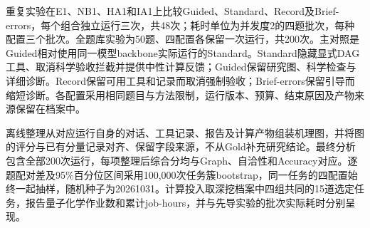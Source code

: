 重复实验在E1、NB1、HA1和IA1上比较Guided、Standard、Record及Brief-errors，每个组合独立运行三次，共48次；耗时单位为并发度2的四题批次，每种配置三个批次。全题库实验为50题、四配置各保留一次运行，共200次。主对照是Guided相对使用同一模型backbone实际运行的Standard。Standard隐藏显式DAG工具、取消科学验收拦截并提供中性计算反馈；Guided保留研究图、科学检查与详细诊断。Record保留可用工具和记录而取消强制验收；Brief-errors保留引导而缩短诊断。各配置采用相同题目与方法限制，运行版本、预算、结束原因及产物来源保留在档案中。

离线整理从对应运行自身的对话、工具记录、报告及计算产物组装机理图，并将图的评分与已有分量记录对齐、保留字段来源，不从Gold补充研究结论。最终分析包含全部200次运行，每项整理后综合分均与Graph、自洽性和Accuracy对应。逐题配对差及95\%百分位区间采用100,000次任务簇bootstrap，同一任务的四配置始终一起抽样，随机种子为20261031。计算投入取深挖档案中四组共同的15道选定任务，报告量子化学作业数和累计job-hours，并与先导实验的批次实际耗时分别呈现。
